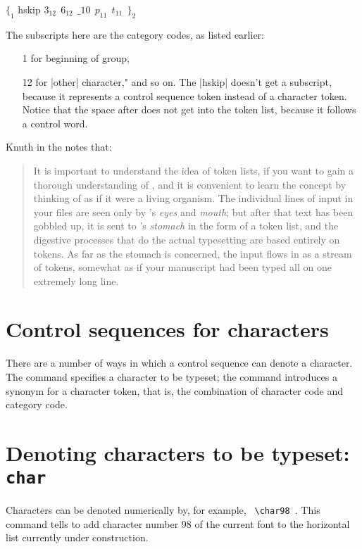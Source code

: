 $ \{_{1}$ hskip $3_{12}~~6_{12}~~\_{10}~~p_{11}~~t_{11}~~\}_2 $

\medskip
The subscripts here are the category codes, as listed earlier:
\begin{itemize}
\item[1] for beginning of group,
\item[12] for |other| character," and so on. The |hskip| doesn't get a subscript, because it
represents a control sequence token instead of a character token. Notice that the space
after  does not get into the token list, because it follows a control word.
\end{itemize}

Knuth in the \texbook notes that:

\begin{quote}

It is important to understand the idea of token lists, if you want to gain a
thorough understanding of \tex, and it is convenient to learn the concept by
thinking of \tex as if it were a living organism. The individual lines of input in your
files are seen only by \tex's \textit{eyes} and \textit{mouth}; but after that text has been gobbled
up, it is sent to \tex's \textit{stomach} in the form of a token list, and the digestive processes
that do the actual typesetting are based entirely on tokens. As far as the stomach is
concerned, the input 
flows in as a stream of tokens, somewhat as if your \tex manuscript
had been typed all on one extremely long line.
\end{quote}

\section{Control sequences for characters}

\DescribeMacro{\char}
There are a number of ways in which a control sequence can denote a character. The \cmd{\char} command
specifies a character to be typeset; the \cmd{\let} command introduces a synonym for a character
token, that is, the combination of character code and category code.

\section{Denoting characters to be typeset: \texttt{char}}

\index{\string\char}
Characters can be denoted numerically by, for example, \verb+ \char98 +. This command tells \tex to add
character number 98 of the current font to the horizontal list currently under construction.

